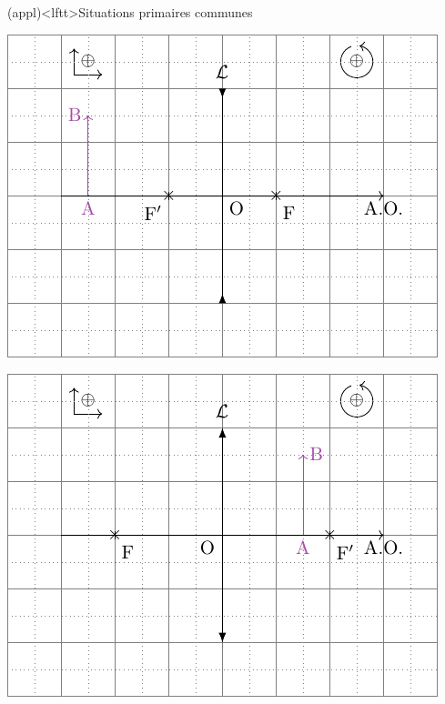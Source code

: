 \documentclass[../../main/main.tex]{subfiles}
\begin{document}
\begin{tcb*}[label=impo:cons_exem](appl)<lftt>{Situations primaires communes}
	\begin{minipage}{0.50\linewidth}
		\begin{center}
			\includegraphics[width=\linewidth]{lent_div-constru_simple-plain}
			\label{fig:divconstrusimple}
		\end{center}
	\end{minipage}
	\hfill
	\begin{minipage}{0.50\linewidth}
		\begin{center}
			\includegraphics[width=\linewidth]{lent_conv-constru_after-plain}

\end{center}
\end{minipage}
\end{tcb*}
\end{document}
